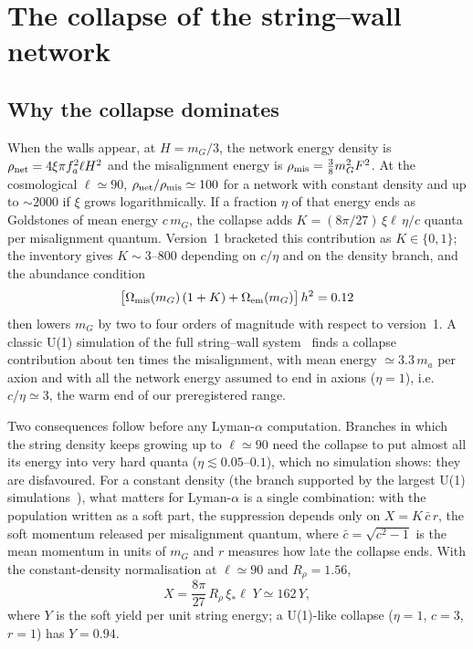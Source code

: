 \documentclass[11pt,a4paper]{article}
\begin{document}
\section{The collapse of the string--wall network}
\label{sec:collapse}

\subsection{Why the collapse dominates}

When the walls appear, at $H=m_G/3$, the network energy density is $\rho_{\rm net}=4\xi\pi f_a^2\ell H^2$ and the misalignment energy is $\rho_{\rm mis}=\tfrac38m_G^2F^2$.
At the cosmological $\ell\simeq90$, $\rho_{\rm net}/\rho_{\rm mis}\simeq100$ for a network with constant density and up to $\sim2000$ if $\xi$ grows logarithmically.
If a fraction $\eta$ of that energy ends as Goldstones of mean energy $c\,m_G$, the collapse adds $K=(8\pi/27)\,\xi\ell\,\eta/c$ quanta per misalignment quantum.
Version~1 bracketed this contribution as $K\in\{0,1\}$; the inventory gives $K\sim3$--$800$ depending on $c/\eta$ and on the density branch, and the abundance condition
\begin{equation}
\big[\Omega_{\rm mis}(m_G)\,(1+K) + \Omega_{\rm em}(m_G)\big]\,h^2 = 0.12
\end{equation}
then lowers $m_G$ by two to four orders of magnitude with respect to version~1.
A classic U(1) simulation of the full string--wall system~\cite{Hiramatsu2012} finds a collapse contribution about ten times the misalignment, with mean energy $\simeq3.3\,m_a$ per axion and with all the network energy assumed to end in axions ($\eta=1$), i.e.\ $c/\eta\simeq3$, the warm end of our preregistered range.

Two consequences follow before any Lyman-$\alpha$ computation.
Branches in which the string density keeps growing up to $\ell\simeq90$ need the collapse to put almost all its energy into very hard quanta ($\eta\lesssim0.05$--$0.1$), which no simulation shows: they are disfavoured.
For a constant density (the branch supported by the largest U(1) simulations~\cite{Correia2025spectrum,Correia2024terasite}), what matters for Lyman-$\alpha$ is a single combination: with the population written as a soft part, the suppression depends only on $X=K\,\bar c\,r$, the soft momentum released per misalignment quantum, where $\bar c=\sqrt{c^2-1}$ is the mean momentum in units of $m_G$ and $r$ measures how late the collapse ends.
With the constant-density normalisation at $\ell\simeq90$ and $R_\rho=1.56$,
\begin{equation}
X = \frac{8\pi}{27}\,R_\rho\,\xi_*\ell\;Y \simeq 162\,Y ,
\end{equation}
where $Y$ is the soft yield per unit string energy; a U(1)-like collapse ($\eta=1$, $c=3$, $r=1$) has $Y=0.94$.
\end{document}
